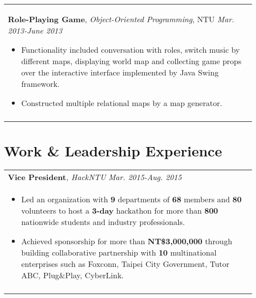 \documentclass[a4paper,10pt]{article} %
\begin{document}
{\begin{tabular}{p{16cm}}
\normalsize\textbf{Role-Playing Game}, {\it{Object-Oriented Programming}}, NTU \hfill {\it Mar. 2013-June 2013}
\vspace{0.5mm}
\begin{itemize}
\item Functionality included conversation with roles, switch music by different maps, displaying world map and collecting game props over the interactive interface implemented by Java Swing framework. 
\item Constructed multiple relational maps by a map generator.  \vspace*{-\baselineskip}
\end{itemize}\\
\vspace{0.5mm}

\end{tabular}


\section{\textbf{Work \& Leadership Experience}}

\begin{tabular}{p{16cm}}

\normalsize\textbf{Vice President}{\it, HackNTU}  \hfill \it{Mar. 2015-Aug. 2015}\\ %
\begin{itemize}
\vspace{-2mm}
\item Led an organization with \textbf{9} departments of \textbf{68} members and \textbf{80} volunteers to host a \textbf{3-day} hackathon for more than \textbf{800} nationwide students and industry professionals.
\item Achieved sponsorship for more than \textbf{NT\$3,000,000} through building collaborative partnership with \textbf{10} multinational enterprises such as 
	Foxconn, Taipei City Government, Tutor ABC, Plug\&Play, CyberLink. \vspace*{-\baselineskip}
\end{itemize}\\
\vspace{0.5mm}


\end{tabular}}
\end{document}
